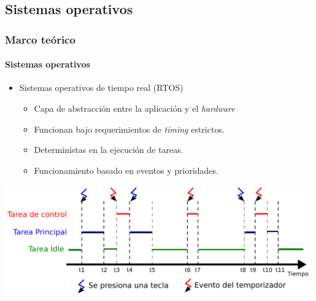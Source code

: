 \documentclass[xcolor=dvipsnames]{beamer}
\begin{document}
    \subsection{Sistemas operativos}
    \begin{frame}
        \frametitle{Marco teórico}
        \framesubtitle{Sistemas operativos}
        
            \begin{itemize}
                \item Sistemas operativos de tiempo real (RTOS)
                \begin{itemize}
                    \item Capa de abstracción entre la aplicación y el \textit{hardware}
                    \item Funcionan bajo requerimientos de \textit{timing} estrictos.
                    \item Deterministas en la ejecución de tareas.
                    \item Funcionamiento basado en eventos y prioridades.
                \end{itemize}
            \end{itemize}
            
        \vspace{0.5cm}
        \centering
        \includegraphics[width=0.99\textwidth]{img/rtos.pdf}
        
    \end{frame}
    
\end{document}
